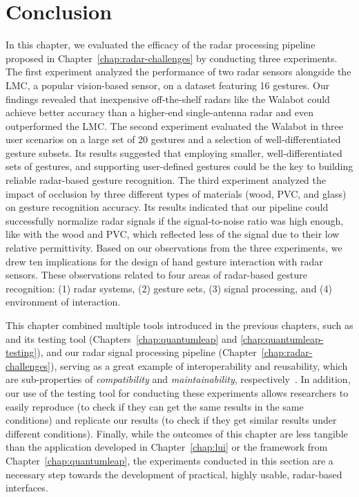 \section{Conclusion} \label{sec:radar-experiments:conclusion}
In this chapter, we evaluated the efficacy of the radar processing pipeline proposed in Chapter~\ref{chap:radar-challenges} by conducting three experiments. 
%
The first experiment analyzed the performance of two radar sensors alongside the LMC, a popular vision-based sensor, on a dataset featuring 16 gestures. Our findings revealed that inexpensive off-the-shelf radars like the Walabot could achieve better accuracy than a higher-end single-antenna radar and even outperformed the LMC.
%
The second experiment evaluated the Walabot in three user scenarios on a large set of 20 gestures and a selection of well-differentiated gesture subsets. Its results suggested that employing smaller, well-differentiated sets of gestures, and supporting user-defined gestures could be the key to building reliable radar-based gesture recognition. 
%
The third experiment analyzed the impact of occlusion by three different types of materials (wood, PVC, and glass) on gesture recognition accuracy. Its results indicated that our pipeline could successfully normalize radar signals if the signal-to-noise ratio was high enough, like with the wood and PVC, which reflected less of the signal due to their low relative permittivity.
%
Based on our observations from the three experiments, we drew ten implications for the design of hand gesture interaction with radar sensors. These observations related to four areas of radar-based gesture recognition: (1) radar systems, (2) gesture sets, (3) signal processing, and (4) environment of interaction.

This chapter combined multiple tools introduced in the previous chapters, such as \ql and its testing tool (Chapters~\ref{chap:quantumleap} and \ref{chap:quantumleap-testing}), and our radar signal processing pipeline (Chapter~\ref{chap:radar-challenges}), serving as a great example of interoperability and reusability, which are sub-properties of \textit{compatibility} and \textit{maintainability}, respectively~\cite{iso25010}.
%
In addition, our use of the \ql testing tool for conducting these experiments allows researchers to easily reproduce (to check if they can get the same results in the same conditions) and replicate our results (to check if they get similar results under different conditions).
%
Finally, while the outcomes of this chapter are less tangible than the \lui application developed in Chapter~\ref{chap:lui} or the \ql framework from Chapter~\ref{chap:quantumleap}, the experiments conducted in this section are a necessary step towards the development of practical, highly usable, radar-based interfaces.

